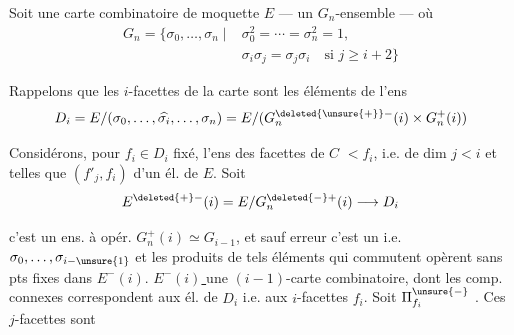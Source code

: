 Soit  une carte combinatoire  de moquette $E$ --- un $G_n$-ensemble --- où
\[
\begin{aligned}
G_n=\{\sigma_0,\ldots,\sigma_n\mid{}&\sigma_0^2=\cdots=\sigma_n^2=1,\\
&\sigma_i\sigma_j=\sigma_j\sigma_i\quad\text{si }j\geq i+2\}
\end{aligned}
\]

Rappelons que les $i$-facettes de la carte sont les éléments de l'ens
\[
D_i=E/(\sigma_0,\ldots,\widehat{\sigma_i},\ldots,\sigma_n)
=E/(G_n^{\deleted{\unsure{+}}-}(i)\times G_n^+(i))
\]

Considérons, pour $f_i\in D_i$ fixé, l'ens des facettes  de $C$  $<f_i$,  i.e. de dim $j<i$ et telles que $(f'_j,f_i)$  d'un él. de $E$. Soit 
\[
E^{\deleted{+}-}(i)=E/G_n^{\deleted{-}+}(i)\longrightarrow D_i
\]

c'est un ens. à opér. $G_n^+(i)\simeq G_{i-1}$,
et sauf erreur c'est un   i.e. $\sigma_0,\ldots,\sigma_{i-\unsure{1}}$ et les produits de tels éléments qui commutent opèrent sans pts fixes dans $E^-(i)$.
\uline{ $E^-(i)$ }   une $(i-1)$-carte combinatoire, dont les comp. connexes correspondent aux él. de $D_i$ i.e. aux $i$-facettes $f_i$.
Soit $\Pi_{f_i}^{\unsure{-}}$  . Ces $j$-facettes sont
